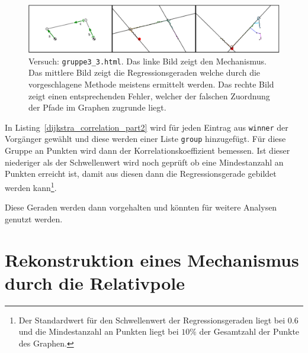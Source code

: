 \begin{figure}
    \centering
    \includegraphics[width=\textwidth]{gfx/correlation_edit.png}
    \caption{Versuch: \lstinline{gruppe3_3.html}. Das linke Bild zeigt den Mechanismus. Das mittlere Bild zeigt die Regressionsgeraden welche durch die vorgeschlagene Methode meistens ermittelt werden. Das rechte Bild zeigt einen entsprechenden Fehler, welcher der falschen Zuordnung der Pfade im Graphen zugrunde liegt.}
    \label{fig:gruppe3_3}
\end{figure}

In Listing~\ref{dijkstra_correlation_part2} wird für jeden Eintrag aus \lstinline{winner} der Vorgänger gewählt und diese werden einer Liste \lstinline{group} hinzugefügt.
Für diese Gruppe an Punkten wird dann der Korrelationskoeffizient bemessen.
Ist dieser niederiger als der Schwellenwert wird noch geprüft ob eine Mindestanzahl an Punkten erreicht ist, damit aus diesen dann die Regressionsgerade gebildet werden kann\footnote{Der Standardwert für den Schwellenwert der Regressionsgeraden liegt bei $0.6$ und die Mindestanzahl an Punkten liegt bei $10\%$ der Gesamtzahl der Punkte des Graphen.}.

Diese Geraden werden dann vorgehalten und könnten für weitere Analysen genutzt werden.

\section{Rekonstruktion eines Mechanismus durch die Relativpole}

